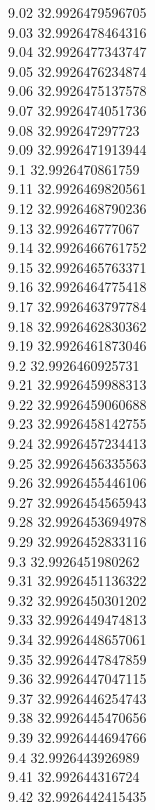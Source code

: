{9.02	32.9926479596705\\
9.03	32.9926478464316\\
9.04	32.9926477343747\\
9.05	32.9926476234874\\
9.06	32.9926475137578\\
9.07	32.9926474051736\\
9.08	32.992647297723\\
9.09	32.9926471913944\\
9.1	32.9926470861759\\
9.11	32.9926469820561\\
9.12	32.9926468790236\\
9.13	32.992646777067\\
9.14	32.9926466761752\\
9.15	32.9926465763371\\
9.16	32.9926464775418\\
9.17	32.9926463797784\\
9.18	32.9926462830362\\
9.19	32.9926461873046\\
9.2	32.9926460925731\\
9.21	32.9926459988313\\
9.22	32.9926459060688\\
9.23	32.9926458142755\\
9.24	32.9926457234413\\
9.25	32.9926456335563\\
9.26	32.9926455446106\\
9.27	32.9926454565943\\
9.28	32.9926453694978\\
9.29	32.9926452833116\\
9.3	32.9926451980262\\
9.31	32.9926451136322\\
9.32	32.9926450301202\\
9.33	32.9926449474813\\
9.34	32.9926448657061\\
9.35	32.9926447847859\\
9.36	32.9926447047115\\
9.37	32.9926446254743\\
9.38	32.9926445470656\\
9.39	32.9926444694766\\
9.4	32.9926443926989\\
9.41	32.992644316724\\
9.42	32.9926442415435\\
}
